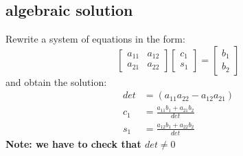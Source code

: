 \documentclass[11pt]{article}
\begin{document}
\subsection{algebraic solution}
Rewrite a system of equations in the form:
\begin{equation}
  \begin{bmatrix}
    a_{11} & a_{12} \\
    a_{21} & a_{22}
  \end{bmatrix}
  \begin{bmatrix}
    c_1 \\
    s_1
  \end{bmatrix}
  =
  \begin{bmatrix}
    b_1 \\
    b_2
  \end{bmatrix}
\end{equation}
and obtain the solution:
\begin{align}
  det & =(a_{11}a_{22}-a_{12}a_{21})      \\
  c_1 & = \frac{a_{11}b_1+a_{21}b_2}{det} \\
  s_1 & = \frac{a_{12}b_1+a_{22}b_2}{det}
\end{align}
\textbf{Note: we have to check that $det \neq 0$}
\end{document}
